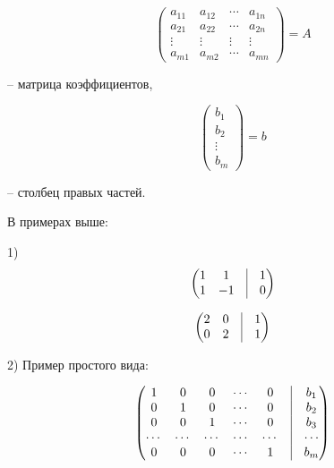 \begin{equation*}
	\begin{pmatrix}
		a_{11} & a_{12} & \cdots & a_{1n} \\
		a_{21} & a_{22} & \cdots & a_{2n} \\
       \vdots & \vdots & \vdots& \vdots \\ 
       a_{m1} & a_{m2} & \cdots & a_{mn}
	\end{pmatrix}
    = A
\end{equation*}

-- матрица коэффициентов,

\begin{equation*}
	\begin{pmatrix}
		b_1 \\
        b_2 \\
        \vdots \\
        b_m
	\end{pmatrix}
    = b
\end{equation*}

-- столбец правых частей.

\vspace{\baselineskip}
В примерах выше:

1) 
\begin{equation*}
	\begin{pmatrix}
		1 & 1 & \vrule & 1 \\
        1 & -1 & \vrule & 0 
	\end{pmatrix}
\end{equation*}

\begin{equation*}
	\begin{pmatrix}
		2 & 0 & \vrule & 1 \\
        0 & 2 & \vrule & 1 
	\end{pmatrix}
\end{equation*}

\vspace{\baselineskip}
2) Пример простого вида:

\begin{equation*}
	\begin{pmatrix}
		1 & 0 & 0 & \cdots & 0 & \vrule & b_1 \\
		0 & 1 & 0 & \cdots & 0 & \vrule & b_2 \\
        0 & 0 & 1 & \cdots & 0 & \vrule & b_3 \\
        \cdots & \cdots & \cdots & \cdots & \cdots & \vrule & \cdots \\
        0 & 0 & 0 & \cdots & 1 & \vrule & b_m 
	\end{pmatrix}
\end{equation*}

